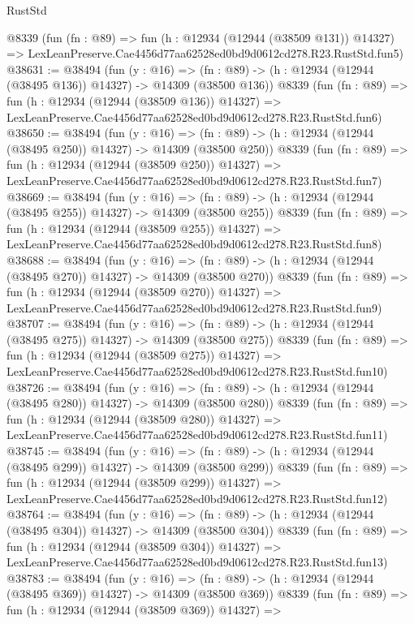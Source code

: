 \begin{lexlean}{RustStd}
\begin{coremodule}
    @8339
    (fun (fn : @89) =>
    fun (h : @12934 (@12944 (@38509 @131)) @14327) =>
    LexLeanPreserve.Cae4456d77aa62528ed0bd9d0612cd278.R23.RustStd.fun5)
@38631 := @38494
    (fun (y : @16) =>
    (fn : @89) -> (h : @12934 (@12944 (@38495 @136)) @14327) -> @14309 (@38500 @136))
    @8339
    (fun (fn : @89) =>
    fun (h : @12934 (@12944 (@38509 @136)) @14327) =>
    LexLeanPreserve.Cae4456d77aa62528ed0bd9d0612cd278.R23.RustStd.fun6)
@38650 := @38494
    (fun (y : @16) =>
    (fn : @89) -> (h : @12934 (@12944 (@38495 @250)) @14327) -> @14309 (@38500 @250))
    @8339
    (fun (fn : @89) =>
    fun (h : @12934 (@12944 (@38509 @250)) @14327) =>
    LexLeanPreserve.Cae4456d77aa62528ed0bd9d0612cd278.R23.RustStd.fun7)
@38669 := @38494
    (fun (y : @16) =>
    (fn : @89) -> (h : @12934 (@12944 (@38495 @255)) @14327) -> @14309 (@38500 @255))
    @8339
    (fun (fn : @89) =>
    fun (h : @12934 (@12944 (@38509 @255)) @14327) =>
    LexLeanPreserve.Cae4456d77aa62528ed0bd9d0612cd278.R23.RustStd.fun8)
@38688 := @38494
    (fun (y : @16) =>
    (fn : @89) -> (h : @12934 (@12944 (@38495 @270)) @14327) -> @14309 (@38500 @270))
    @8339
    (fun (fn : @89) =>
    fun (h : @12934 (@12944 (@38509 @270)) @14327) =>
    LexLeanPreserve.Cae4456d77aa62528ed0bd9d0612cd278.R23.RustStd.fun9)
@38707 := @38494
    (fun (y : @16) =>
    (fn : @89) -> (h : @12934 (@12944 (@38495 @275)) @14327) -> @14309 (@38500 @275))
    @8339
    (fun (fn : @89) =>
    fun (h : @12934 (@12944 (@38509 @275)) @14327) =>
    LexLeanPreserve.Cae4456d77aa62528ed0bd9d0612cd278.R23.RustStd.fun10)
@38726 := @38494
    (fun (y : @16) =>
    (fn : @89) -> (h : @12934 (@12944 (@38495 @280)) @14327) -> @14309 (@38500 @280))
    @8339
    (fun (fn : @89) =>
    fun (h : @12934 (@12944 (@38509 @280)) @14327) =>
    LexLeanPreserve.Cae4456d77aa62528ed0bd9d0612cd278.R23.RustStd.fun11)
@38745 := @38494
    (fun (y : @16) =>
    (fn : @89) -> (h : @12934 (@12944 (@38495 @299)) @14327) -> @14309 (@38500 @299))
    @8339
    (fun (fn : @89) =>
    fun (h : @12934 (@12944 (@38509 @299)) @14327) =>
    LexLeanPreserve.Cae4456d77aa62528ed0bd9d0612cd278.R23.RustStd.fun12)
@38764 := @38494
    (fun (y : @16) =>
    (fn : @89) -> (h : @12934 (@12944 (@38495 @304)) @14327) -> @14309 (@38500 @304))
    @8339
    (fun (fn : @89) =>
    fun (h : @12934 (@12944 (@38509 @304)) @14327) =>
    LexLeanPreserve.Cae4456d77aa62528ed0bd9d0612cd278.R23.RustStd.fun13)
@38783 := @38494
    (fun (y : @16) =>
    (fn : @89) -> (h : @12934 (@12944 (@38495 @369)) @14327) -> @14309 (@38500 @369))
    @8339
    (fun (fn : @89) =>
    fun (h : @12934 (@12944 (@38509 @369)) @14327) =>

\end{coremodule}
\end{lexlean}
